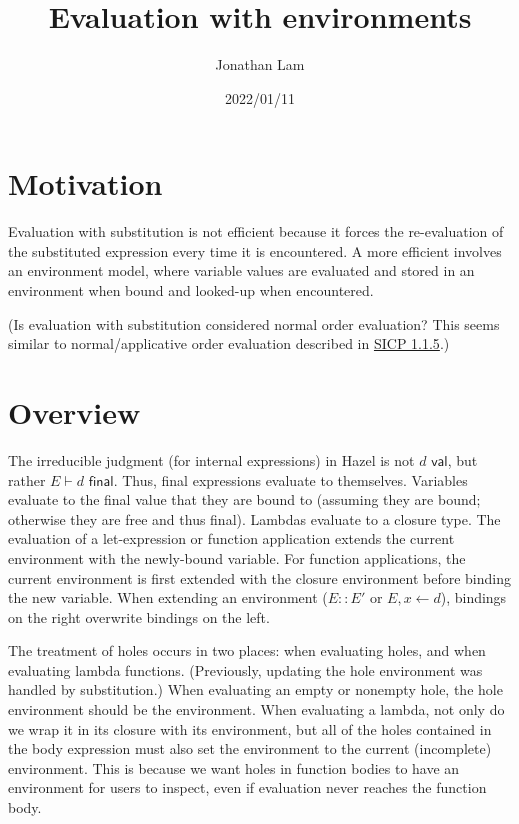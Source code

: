 \documentclass{article}
\title{Evaluation with environments}
\author{Jonathan Lam}
\date{2022/01/11}
\begin{document}
\maketitle{}

\section{Motivation}

Evaluation with substitution is not efficient because it forces the re-evaluation of the substituted expression every time it is encountered. A more efficient involves an environment model, where variable values are evaluated and stored in an environment when bound and looked-up when encountered.

(Is evaluation with substitution considered normal order evaluation? This seems similar to normal/applicative order evaluation described in \href{https://mitpress.mit.edu/sites/default/files/sicp/full-text/book/book-Z-H-10.html#%_sec_1.1.5}{SICP 1.1.5}.)

\section{Overview}

The irreducible judgment (for internal expressions) in Hazel is not $d\textsf{ val}$, but rather $E\vdash d\textsf{ final}$. Thus, final expressions evaluate to themselves. Variables evaluate to the final value that they are bound to (assuming they are bound; otherwise they are free and thus final). Lambdas evaluate to a closure type. The evaluation of a let-expression or function application extends the current environment with the newly-bound variable. For function applications, the current environment is first extended with the closure environment before binding the new variable. When extending an environment ($E::E'$ or $E,x\leftarrow d$), bindings on the right overwrite bindings on the left.

The treatment of holes occurs in two places: when evaluating holes, and when evaluating lambda functions. (Previously, updating the hole environment was handled by substitution.) When evaluating an empty or nonempty hole, the hole environment should be the environment. When evaluating a lambda, not only do we wrap it in its closure with its environment, but all of the holes contained in the body expression must also set the environment to the current (incomplete) environment. This is because we want holes in function bodies to have an environment for users to inspect, even if evaluation never reaches the function body.
\end{document}
